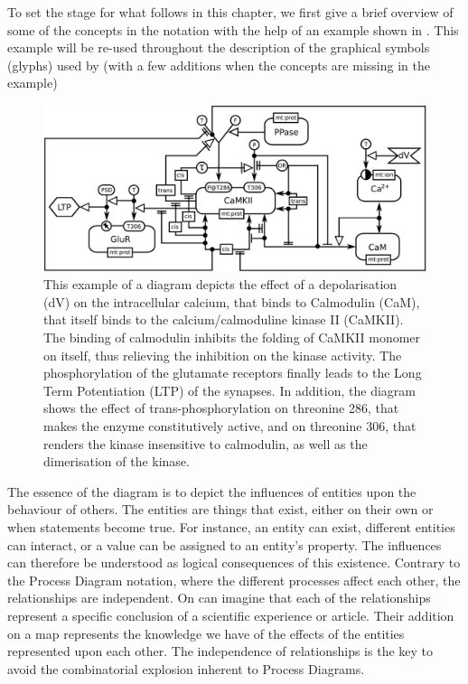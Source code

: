 
To set the stage for what follows in this chapter, we first give a brief overview of some of the concepts in the \ER notation with the help of an example shown in . This example will be re-used throughout the description of the graphical symbols (glyphs) used by \SBGNERLone (with a few additions when the concepts are missing in the example) 

\begin{figure}[H]
  \centering
  \vspace*{-0.75em}
  \includegraphics[scale=0.45]{examples/CaMKII-intro-new}
   \caption{This example of a \ER diagram depicts the effect of a depolarisation (dV) on the intracellular calcium, that binds to Calmodulin (CaM), that itself binds to the calcium/calmoduline kinase II (CaMKII). The binding of calmodulin inhibits the folding of CaMKII monomer on itself, thus relieving the inhibition on the kinase activity. The phosphorylation of the glutamate receptors finally leads to the Long Term Potentiation (LTP) of the synapses. In addition, the diagram shows the effect of trans-phosphorylation on threonine 286, that makes the enzyme constitutively active, and on threonine 306, that renders the kinase insensitive to calmodulin, as well as the dimerisation of the kinase.}
  \label{fig:eg1}
\end{figure}
 
The essence of the \ER diagram is to depict the influences of entities upon the behaviour of others. The entities are things that exist, either on their own or when statements become true. For instance, an entity can exist, different entities can interact, or a value can be assigned to an entity's property. The influences can therefore be understood as logical consequences of this existence. Contrary to the Process Diagram notation, where the different processes affect each other, the relationships are independent. On can imagine that each of the relationships represent a specific conclusion of a scientific experience or article. Their addition on a map represents the knowledge we have of the effects of the entities represented upon each other. The independence of relationships is the key to avoid the combinatorial explosion inherent to Process Diagrams.

